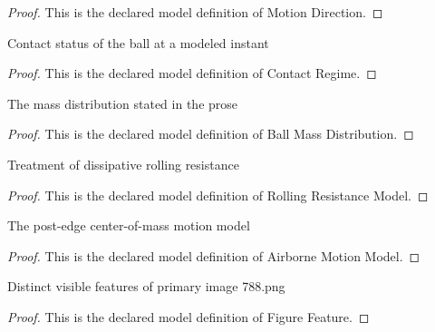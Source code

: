 \begin{proof}
  This is the declared model definition of Motion Direction.
\end{proof}
\begin{definition}
  \label{def:physics:phyx-mini-0788:phyxminiproblems-problemphyxmini0788-contactregime}
  Contact status of the ball at a modeled instant
\end{definition}
\begin{proof}
  This is the declared model definition of Contact Regime.
\end{proof}
\begin{definition}
  \label{def:physics:phyx-mini-0788:phyxminiproblems-problemphyxmini0788-ballmassdistribution}
  The mass distribution stated in the prose
\end{definition}
\begin{proof}
  This is the declared model definition of Ball Mass Distribution.
\end{proof}
\begin{definition}
  \label{def:physics:phyx-mini-0788:phyxminiproblems-problemphyxmini0788-rollingresistancemodel}
  Treatment of dissipative rolling resistance
\end{definition}
\begin{proof}
  This is the declared model definition of Rolling Resistance Model.
\end{proof}
\begin{definition}
  \label{def:physics:phyx-mini-0788:phyxminiproblems-problemphyxmini0788-airbornemotionmodel}
  The post-edge center-of-mass motion model
\end{definition}
\begin{proof}
  This is the declared model definition of Airborne Motion Model.
\end{proof}
\begin{definition}
  \label{def:physics:phyx-mini-0788:phyxminiproblems-problemphyxmini0788-figurefeature}
  Distinct visible features of primary image 788.png
\end{definition}
\begin{proof}
  This is the declared model definition of Figure Feature.
\end{proof}
